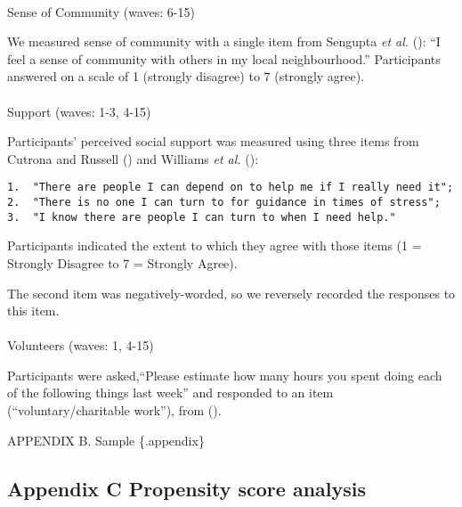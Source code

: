 \documentclass[
  singlecolumn,
  9pt]{article}
\makeatletter
\let\oldparagraph\paragraph
\renewcommand{\paragraph}{
    \@ifstar
      \xxxParagraphStar
      \xxxParagraphNoStar
  }
\newcommand{\xxxParagraphStar}[1]{\oldparagraph*{#1}\mbox{}}
\newcommand{\xxxParagraphNoStar}[1]{\oldparagraph{#1}\mbox{}}
\makeatother
\begin{document}
\paragraph{Sense of Community (waves:
6-15)}\label{sense-of-community-waves-6-15}

We measured sense of community with a single item from Sengupta \emph{et
al.} (): ``I feel a sense of community
with others in my local neighbourhood.'' Participants answered on a
scale of 1 (strongly disagree) to 7 (strongly agree).

\paragraph{Support (waves: 1-3, 4-15)}\label{support-waves-1-3-4-15}

Participants' perceived social support was measured using three items
from Cutrona and Russell () and Williams
\emph{et al.} ():

\begin{verbatim}
1.  "There are people I can depend on to help me if I really need it";
2.  "There is no one I can turn to for guidance in times of stress";
3.  "I know there are people I can turn to when I need help." 
\end{verbatim}

Participants indicated the extent to which they agree with those items
(1 = Strongly Disagree to 7 = Strongly Agree).

The second item was negatively-worded, so we reversely recorded the
responses to this item.

\paragraph{Volunteers (waves: 1, 4-15)}\label{volunteers-waves-1-4-15}

Participants were asked,``Please estimate how many hours you spent doing
each of the following things last week'' and responded to an item
(``voluntary/charitable work''), from ().

\newpage{}

APPENDIX B. Sample \{.appendix\}

\newpage{}

\subsection{Appendix C Propensity score
analysis}\label{appendix-c-propensity-score-analysis}
\end{document}
